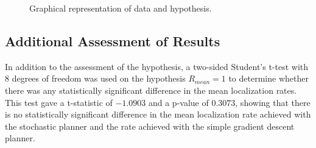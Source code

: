 \documentclass[submit, 12pt]{aiaa-pretty-modified}
\begin{document}
\begin{figure}
\begin{center}
\caption{Graphical representation of data and hypothesis.}
\label{fig:killer}
\end{center}
\end{figure}


\subsection{Additional Assessment of Results}
\label{sec:additional}
In addition to the assessment of the hypothesis, a two-sided Student's
t-test with 8 degrees of freedom was used on the hypothesis $R_{mean}
= 1$ to determine whether there was any statistically significant
difference in the mean localization rates.  This test gave
a t-statistic of $-1.0903$ and a p-value of $0.3073$, showing that
there is no statistically significant difference in the mean localization
rate achieved with the stochastic planner and the rate achieved with
the simple gradient descent planner.
\end{document}
